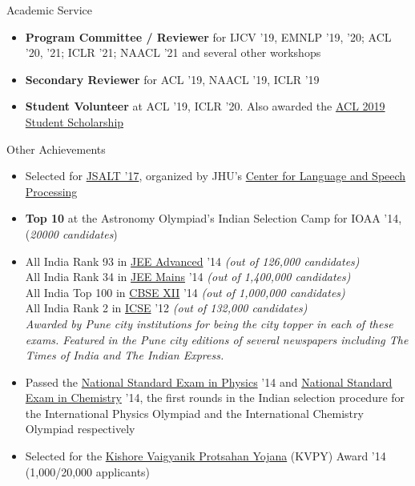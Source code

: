 \documentclass{resume} %
\begin{document}
\begin{rSection}{Academic Service}
\vspace*{0.1in}
\begin{itemize}[leftmargin=*]
\item \textbf{Program Committee / Reviewer} for IJCV '19, EMNLP '19, '20; ACL '20, '21; ICLR '21; NAACL '21 and several other workshops
\item \textbf{Secondary Reviewer} for ACL '19, NAACL '19, ICLR '19
\item \textbf{Student Volunteer} at ACL '19, ICLR '20. Also awarded the \href{http://www.acl2019.org/EN/student-scholarship-applications-volunteers.xhtml}{ACL 2019 Student Scholarship}
\end{itemize}
\end{rSection}

\begin{rSection}{Other Achievements}
\begin{itemize}[leftmargin=*]
\item Selected for \href{https://www.lti.cs.cmu.edu/2017-jsalt-undergraduate}{JSALT '17}, organized by JHU's \href{https://www.clsp.jhu.edu/}{Center for Language and Speech Processing}\footnotemark[2] 
\item \textbf{Top 10} at the Astronomy Olympiad's Indian Selection Camp for IOAA '14, (\textit{20000 candidates})
\item All India Rank 93 in \href{https://en.wikipedia.org/wiki/Joint_Entrance_Examination}{JEE Advanced} '14 \textit{(out of 126,000 candidates)} \\ All India Rank 34 in \href{https://en.wikipedia.org/wiki/Joint_Entrance_Examination}{JEE Mains} '14 \textit{(out of 1,400,000 candidates)} \\
All India Top 100 in \href{https://en.wikipedia.org/wiki/Central_Board_of_Secondary_Education}{CBSE XII} '14 \textit{(out of 1,000,000 candidates)} \\
All India Rank 2 in \href{https://en.wikipedia.org/wiki/Indian_Certificate_of_Secondary_Education}{ICSE} '12 \textit{(out of 132,000 candidates)}\\
\textit{Awarded by Pune city institutions for being the city topper in each of these exams. Featured in the Pune city editions of several newspapers including The Times of India and The Indian Express.}
\item Passed the \href{https://www.iapt.org.in/exams/nse/nsep.html}{National Standard Exam in Physics} '14 and \href{https://www.iapt.org.in/exams/nse/nsec-b-a-js.html}{National Standard Exam in Chemistry} '14, the first rounds in the Indian selection procedure for the International Physics Olympiad and the International Chemistry Olympiad respectively
\item Selected for the \href{http://www.kvpy.iisc.ernet.in/main/index.htm}{Kishore Vaigyanik Protsahan Yojana} (KVPY) Award '14 (1,000/20,000 applicants)
\end{itemize}
\end{rSection}
\end{document}
